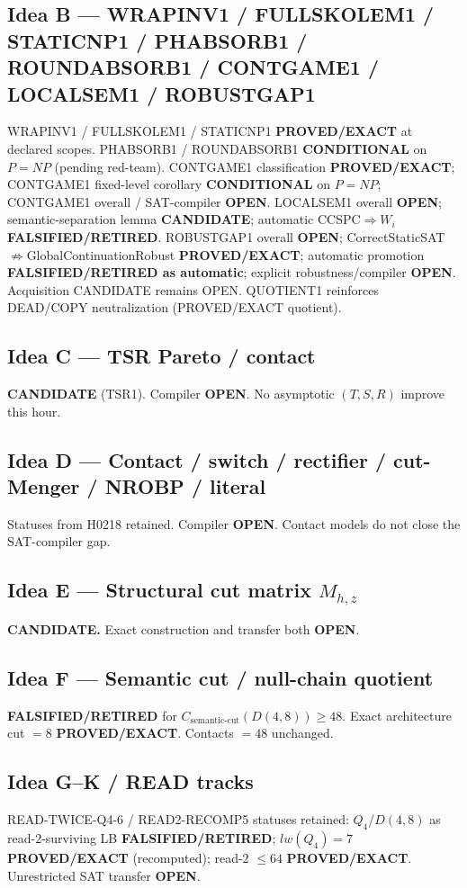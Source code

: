 \documentclass[11pt]{article}
\begin{document}
\subsection*{Idea B --- WRAPINV1 / FULLSKOLEM1 / STATICNP1 / PHABSORB1 / ROUNDABSORB1 / CONTGAME1 / LOCALSEM1 / ROBUSTGAP1}
WRAPINV1 / FULLSKOLEM1 / STATICNP1 \textbf{PROVED/EXACT} at declared scopes.
PHABSORB1 / ROUNDABSORB1 \textbf{CONDITIONAL} on $P=NP$ (pending red-team).
CONTGAME1 classification \textbf{PROVED/EXACT}; CONTGAME1 fixed-level corollary
\textbf{CONDITIONAL} on $P=NP$; CONTGAME1 overall / SAT-compiler \textbf{OPEN}.
LOCALSEM1 overall \textbf{OPEN}; semantic-separation lemma \textbf{CANDIDATE};
automatic CCSPC$\Rightarrow W_i$ \textbf{FALSIFIED/RETIRED}.
ROBUSTGAP1 overall \textbf{OPEN}; CorrectStaticSAT$\not\Rightarrow$GlobalContinuationRobust
\textbf{PROVED/EXACT}; automatic promotion \textbf{FALSIFIED/RETIRED as automatic};
explicit robustness/compiler \textbf{OPEN}.
Acquisition CANDIDATE remains OPEN.
QUOTIENT1 reinforces DEAD/COPY neutralization (PROVED/EXACT quotient).

\subsection*{Idea C --- TSR Pareto / contact}
\textbf{CANDIDATE} (TSR1). Compiler \textbf{OPEN}. No asymptotic $(T,S,R)$ improve this hour.

\subsection*{Idea D --- Contact / switch / rectifier / cut-Menger / NROBP / literal}
Statuses from H0218 retained. Compiler \textbf{OPEN}. Contact models do not close the SAT-compiler gap.

\subsection*{Idea E --- Structural cut matrix $M_{h,z}$}
\textbf{CANDIDATE.} Exact construction and transfer both \textbf{OPEN}.

\subsection*{Idea F --- Semantic cut / null-chain quotient}
\textbf{FALSIFIED/RETIRED} for $C_{\mathrm{semantic\textrm{-}cut}}(D(4,8))\ge48$.
Exact architecture cut $=8$ \textbf{PROVED/EXACT}. Contacts $=48$ unchanged.

\subsection*{Idea G--K / READ tracks}
READ-TWICE-Q4-6 / READ2-RECOMP5 statuses retained: $Q_4$/$D(4,8)$ as read-$2$-surviving LB
\textbf{FALSIFIED/RETIRED}; $lw(Q_4)=7$ \textbf{PROVED/EXACT} (recomputed); read-$2$ $\le64$
\textbf{PROVED/EXACT}. Unrestricted SAT transfer \textbf{OPEN}.
\end{document}
